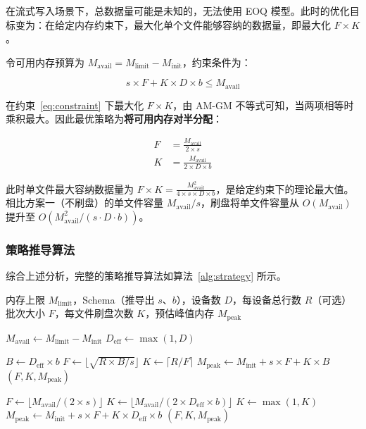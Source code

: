 在流式写入场景下，总数据量可能是未知的，无法使用 EOQ 模型。此时的优化目标变为：在给定内存约束下，最大化单个文件能够容纳的数据量，即最大化 $F \times K$。

令可用内存预算为 $M_{\text{avail}} = M_{\text{limit}} - M_{\text{init}}$，约束条件为：

\begin{equation}
  s \times F + K \times D \times b \leq M_{\text{avail}}
  \label{eq:constraint}
\end{equation}

在约束~\eqref{eq:constraint} 下最大化 $F \times K$，由 AM-GM 不等式可知，当两项相等时乘积最大。因此最优策略为\textbf{将可用内存对半分配}：

\begin{align}
  F &= \frac{M_{\text{avail}}}{2 \times s} \label{eq:f-half} \\
  K &= \frac{M_{\text{avail}}}{2 \times D \times b} \label{eq:k-half}
\end{align}

此时单文件最大容纳数据量为 $F \times K = \frac{M_{\text{avail}}^2}{4 \times s \times D \times b}$，是给定约束下的理论最大值。相比方案一（不刷盘）的单文件容量 $M_{\text{avail}} / s$，刷盘将单文件容量从 $O(M_{\text{avail}})$ 提升至 $O(M_{\text{avail}}^2 / (s \cdot D \cdot b))$。


\subsubsection{策略推导算法}

综合上述分析，完整的策略推导算法如算法~\ref{alg:strategy} 所示。

\begin{algorithm}[htbp]
  \caption{自适应写入策略推导}
  \label{alg:strategy}
  \small
  \begin{algorithmic}
    \REQUIRE 内存上限 $M_{\text{limit}}$，Schema（推导出 $s$、$b$），设备数 $D$，每设备总行数 $R$（可选）
    \ENSURE 批次大小 $F$，每文件刷盘次数 $K$，预估峰值内存 $M_{\text{peak}}$

    \STATE $M_{\text{avail}} \leftarrow M_{\text{limit}} - M_{\text{init}}$
    \STATE $D_{\text{eff}} \leftarrow \max(1, D)$ 

      \STATE {}
      \STATE $B \leftarrow D_{\text{eff}} \times b$
      \STATE $F \leftarrow \lfloor\sqrt{R \times B / s}\rfloor$
      \STATE $K \leftarrow \lceil R / F \rceil$
      \STATE $M_{\text{peak}} \leftarrow M_{\text{init}} + s \times F + K \times B$
        \RETURN $(F, K, M_{\text{peak}})$
      \ENDIF
    \ENDIF

    \STATE {}
    \STATE $F \leftarrow \lfloor M_{\text{avail}} / (2 \times s) \rfloor$
    \STATE $K \leftarrow \lfloor M_{\text{avail}} / (2 \times D_{\text{eff}} \times b) \rfloor$
    \STATE $K \leftarrow \max(1, K)$
    \STATE $M_{\text{peak}} \leftarrow M_{\text{init}} + s \times F + K \times D_{\text{eff}} \times b$
    \RETURN $(F, K, M_{\text{peak}})$
  \end{algorithmic}
\end{algorithm}

